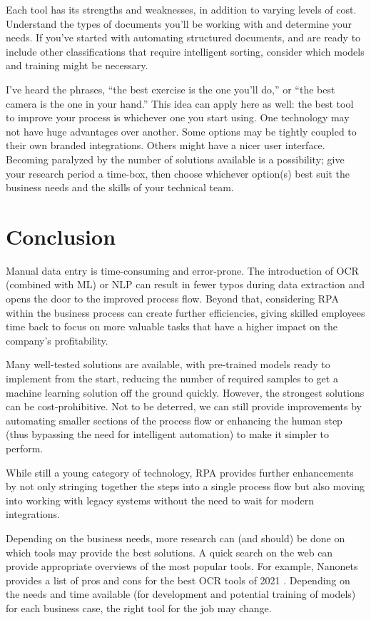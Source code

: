 \documentclass[conference]{IEEEtran}
\begin{document}
Each tool has its strengths and weaknesses, in addition to varying levels of cost. Understand the types of documents you'll be working with and determine your needs. If you've started with automating structured documents, and are ready to include other classifications that require intelligent sorting, consider which models and training might be necessary.

I've heard the phrases, ``the best exercise is the one you'll do,'' or ``the best camera is the one in your hand.'' This idea can apply here as well: the best tool to improve your process is whichever one you start using. One technology may not have huge advantages over another. Some options may be tightly coupled to their own branded integrations. Others might have a nicer user interface. Becoming paralyzed by the number of solutions available is a possibility; give your research period a time-box, then choose whichever option(s) best suit the business needs and the skills of your technical team.

\section{Conclusion}
Manual data entry is time-consuming and error-prone. The introduction of OCR (combined with ML) or NLP can result in fewer typos during data extraction and opens the door to the improved process flow. Beyond that, considering RPA within the business process can create further efficiencies, giving skilled employees time back to focus on more valuable tasks that have a higher impact on the company's profitability.

Many well-tested solutions are available, with pre-trained models ready to implement from the start, reducing the number of required samples to get a machine learning solution off the ground quickly. However, the strongest solutions can be cost-prohibitive. Not to be deterred, we can still provide improvements by automating smaller sections of the process flow or enhancing the human step (thus bypassing the need for intelligent automation) to make it simpler to perform.

While still a young category of technology, RPA provides further enhancements by not only stringing together the steps into a single process flow but also moving into working with legacy systems without the need to wait for modern integrations.

Depending on the business needs, more research can (and should) be done on which tools may provide the best solutions. A quick search on the web can provide appropriate overviews of the most popular tools. For example, Nanonets provides a list of pros and cons for the best OCR tools of 2021 \cite{prithiv2021best}. Depending on the needs and time available (for development and potential training of models) for each business case, the right tool for the job may change.
\end{document}
